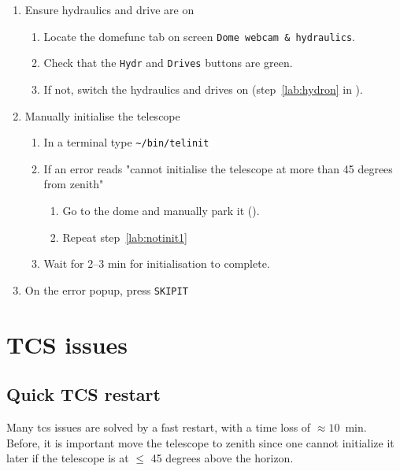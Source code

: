 \documentclass[11pt,fleqn,a4paper]{book}
\def\home{\textasciitilde{}}
\begin{document}
\begin{enumerate}
    \item Ensure hydraulics and drive are on
        \begin{enumerate}
            \item Locate the \gls{domefunc} tab on screen \texttt{Dome webcam \& hydraulics}. 
            \item Check that the \texttt{Hydr} and \texttt{Drives} buttons are green.
            \item If not, switch the hydraulics and drives on (step~\ref{lab:hydron} in ).
        \end{enumerate}
    \item Manually initialise the telescope
        \begin{enumerate}
            \item\label{lab:notinit1} 
                In a terminal type \texttt{\home/bin/telinit}
            \item If an error reads "cannot initialise the 
                telescope at more than 45 degrees from zenith"
                \begin{enumerate}
                    \item Go to the dome and manually park it (). 
                    \item Repeat step~\ref{lab:notinit1}
                \end{enumerate}
            \item Wait for 2--3 min for initialisation to complete.
        \end{enumerate}
    \item On the error popup, press \texttt{SKIPIT}
\end{enumerate}

\section{TCS issues}
\subsection{Quick TCS restart}
\label{sec:tcsrestart}

Many \gls{tcs} issues are solved by a fast restart, with a time loss of $\approx 10$~min. Before, it is important move the telescope to zenith since one cannot initialize it later if the telescope is at $\le$ 45 degrees above the horizon.
\end{document}
